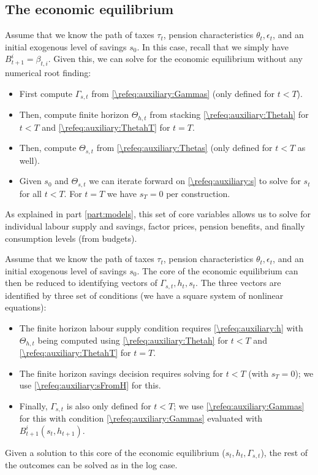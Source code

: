 \documentclass[a4paper]{article}
\begin{document}
\subsection{The economic equilibrium}\label{\refsec:EE}

Assume that we know the path of taxes $\tau_t$, pension characteristics $\theta_t, \epsilon_t$, and an initial exogenous level of savings $s_0$. In this case, recall that we simply have $B_{t+1}^i = \beta_{t,i}$. Given this, we can solve for the economic equilibrium without any numerical root finding: 
\begin{itemize}
    \item First compute $\Gamma_{s,t}$ from \eqref{\refeq:auxiliary:Gammas} (only defined for $t<T$).
    \item Then, compute finite horizon $\Theta_{h,t}$ from stacking \eqref{\refeq:auxiliary:Thetah} for $t<T$ and \eqref{\refeq:auxiliary:ThetahT} for $t=T$. 
    \item Then, compute $\Theta_{s,t}$ from \eqref{\refeq:auxiliary:Thetas} (only defined for $t<T$ as well).
    \item Given $s_0$ and $\Theta_{s,t}$ we can iterate forward on \eqref{\refeq:auxiliary:s} to solve for $s_t$ for all $t<T$. For $t=T$ we have $s_T = 0$ per construction. 
\end{itemize}
As explained in part \ref{part:models}, this set of core variables allows us to solve for individual labour supply and savings, factor prices, pension benefits, and finally consumption levels (from budgets). 





Assume that we know the path of taxes $\tau_t$, pension characteristics $\theta_t, \epsilon_t$, and an initial exogenous level of savings $s_0$. The core of the economic equilibrium can then be reduced to identifying vectors of $\Gamma_{s,t}, h_t, s_t$. The three vectors are identified by three set of conditions (we have a square system of nonlinear equations):
\begin{itemize}
    \item The finite horizon labour supply condition requires \eqref{\refeq:auxiliary:h} with $\Theta_{h,t}$ being computed using \eqref{\refeq:auxiliary:Thetah} for $t<T$ and \eqref{\refeq:auxiliary:ThetahT} for $t=T$. 
    \item The finite horizon savings decision requires solving for $t<T$ (with $s_T = 0$); we use \eqref{\refeq:auxiliary:sFromH} for this. 
    \item Finally, $\Gamma_{s,t}$ is also only defined for $t<T$; we use \eqref{\refeq:auxiliary:Gammas} for this with condition \eqref{\refeq:auxiliary:Gammas} evaluated with $B_{t+1}^i(s_t, h_{t+1})$.
\end{itemize}
Given a solution to this core of the economic equilibrium ($s_t, h_t, \Gamma_{s,t}$), the rest of the outcomes can be solved as in the log case. 
    
\end{document}
